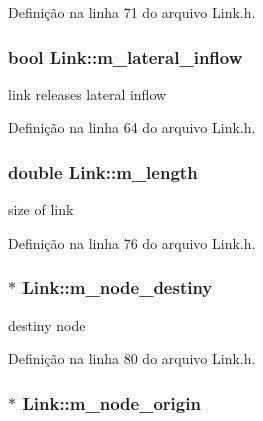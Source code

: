 Definição na linha 71 do arquivo Link.\+h.

\subsubsection[{m\+\_\+lateral\+\_\+inflow}]{\setlength{\rightskip}{0pt plus 5cm}bool Link\+::m\+\_\+lateral\+\_\+inflow\hspace{0.3cm}{\ttfamily [protected]}}\label{class_link_a32e0daf870debba80ca149012dcaa84e}


link releases lateral inflow 



Definição na linha 64 do arquivo Link.\+h.

\subsubsection[{m\+\_\+length}]{\setlength{\rightskip}{0pt plus 5cm}double Link\+::m\+\_\+length\hspace{0.3cm}{\ttfamily [protected]}}\label{class_link_a57c501355ec7c05dc11d273702e58183}


size of link 



Definição na linha 76 do arquivo Link.\+h.

\subsubsection[{m\+\_\+node\+\_\+destiny}]{$\ast$ Link\+::m\+\_\+node\+\_\+destiny\hspace{0.3cm}{\ttfamily [protected]}}\label{class_link_a0c4934134bba0faa12b8a4bd7eec334a}


destiny node 



Definição na linha 80 do arquivo Link.\+h.

\subsubsection[{m\+\_\+node\+\_\+origin}]{$\ast$ Link\+::m\+\_\+node\+\_\+origin\hspace{0.3cm}{\ttfamily [protected]}}\label{class_link_a910d7a7da9e38e108eab3d5764b7f601}


